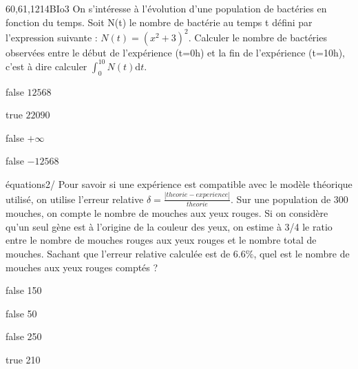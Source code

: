         \begin{question}{60,61,1214}{BIo}{3}{}
          On s'intéresse à l'évolution d'une population de bactéries en fonction du temps. Soit N(t) le nombre de bactérie au temps t défini par l'expression suivante : $N(t) = (x^2+3)^2 $. Calculer le nombre de bactéries observées entre le début de l'expérience (t=0h) et la fin de l'expérience (t=10h), c'est à dire calculer $\int^{10}_{0} N(t) \mathrm{d}t$.
        \end{question}
        \begin{reponses}
            \item[false] $12568$
            \item[true] $22090$
            \item[false]  $+\infty$
            \item[false] $-12568$
        \end{reponses}
            \begin{question}{8}{équations}{2}{/} 
            	Pour savoir si une expérience est compatible avec le modèle théorique utilisé, on utilise l'erreur relative $\delta = \frac{|theorie-experience|}{theorie}$. Sur une population de 300 mouches, on compte le nombre de mouches aux yeux rouges. Si on considère qu'un seul gène est à l'origine de la couleur des yeux, on estime à 3/4 le ratio entre le nombre de mouches rouges aux yeux rouges et le nombre total de mouches. Sachant que l'erreur relative calculée est de $6.6\%$, quel est le nombre de mouches aux yeux rouges comptés ? 
            \end{question}
            \begin{reponses}
            	\item[false]  150
            	\item[false]  50
                \item[false]  250
                \item[true]   210
            \end{reponses}
